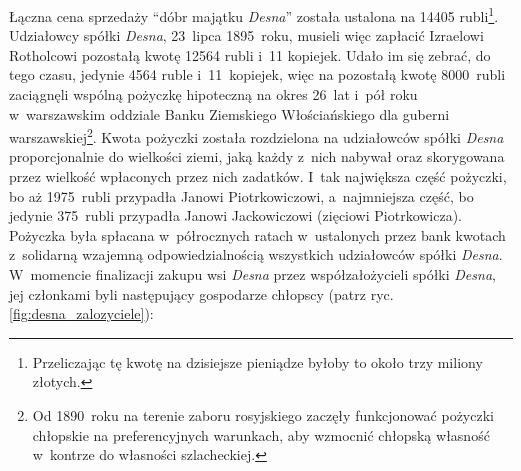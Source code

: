Łączna cena sprzedaży \enquote{dóbr majątku \emph{Desna}} została ustalona na
14405 rubli\footnote{Przeliczając tę kwotę na dzisiejsze pieniądze byłoby to
około trzy miliony złotych.}. Udziałowcy spółki \emph{Desna}, 23~lipca
1895~roku, musieli więc zapłacić Izraelowi Rotholcowi pozostałą kwotę 12564
rubli i~11 kopiejek. Udało im się zebrać, do tego czasu, jedynie 4564 ruble
i~11~kopiejek, więc na pozostałą kwotę 8000~rubli zaciągnęli wspólną pożyczkę
hipoteczną na okres 26~lat i~pół roku w~warszawskim oddziale Banku Ziemskiego
Włościańskiego dla guberni warszawskiej\footnote{Od 1890~roku na terenie
zaboru rosyjskiego zaczęły funkcjonować pożyczki chłopskie na preferencyjnych
warunkach, aby wzmocnić chłopską własność w~kontrze do własności
szlacheckiej.}. Kwota pożyczki została rozdzielona na udziałowców spółki
\emph{Desna} proporcjonalnie do wielkości ziemi, jaką każdy z~nich nabywał
oraz skorygowana przez wielkość wpłaconych przez nich zadatków.  I~tak
największa część pożyczki, bo aż 1975~rubli przypadła Janowi Piotrkowiczowi,
a~najmniejsza część, bo jedynie 375~rubli przypadła Janowi Jackowiczowi
(zięciowi Piotrkowicza). Pożyczka była spłacana w~półrocznych ratach
w~ustalonych przez bank kwotach z~solidarną wzajemną odpowiedzialnością
wszystkich udziałowców spółki \emph{Desna}. W~momencie finalizacji zakupu wsi
\emph{Desna} przez współzałożycieli spółki \emph{Desna}, jej członkami byli
następujący gospodarze chłopscy (patrz ryc. \ref{fig:desna_zalozyciele}):

